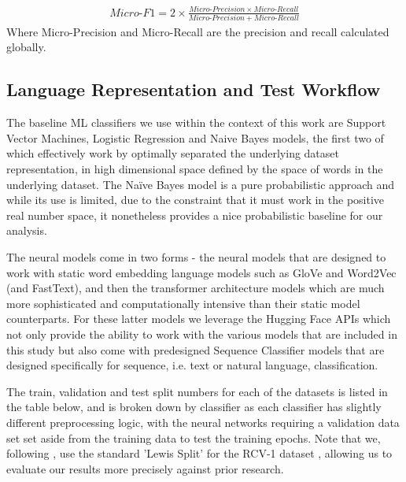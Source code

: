 \documentclass[final]{clv2025-revised}
\begin{document}
\begin{align*}
    Micro\text{-}F1=2\times \frac{Micro \text{-}Precision\times Micro\text{-}Recall}{Micro\text{-}Precision+Micro\text{-}Recall}
\end{align*}
Where Micro-Precision and Micro-Recall are the precision and recall calculated globally.


\subsection{Language Representation and Test Workflow}
The baseline ML classifiers we use within the context of this work are Support Vector Machines, Logistic Regression and Naive Bayes models, the first two of which effectively work by optimally separated the underlying dataset representation, in high dimensional space defined by the space of words in the underlying dataset. The Naïve Bayes model is a pure probabilistic approach and while its use is limited, due to the constraint that it must work in the positive real number space, it nonetheless provides a nice probabilistic baseline for our analysis. 

The neural models come in two forms - the neural models that are designed to work with static word embedding language models such as GloVe and Word2Vec (and FastText), and then the transformer architecture models which are much more sophisticated and computationally intensive than their static model counterparts. For these latter models we leverage the Hugging Face APIs which not only provide the ability to work with the various models that are included in this study but also come with predesigned Sequence Classifier models that are designed specifically for sequence, i.e. text or natural language, classification.

The train, validation and test split numbers for each of the datasets is listed in the table below, and is broken down by classifier as each classifier has slightly different preprocessing logic, with the neural networks requiring a validation data set set aside from the training data to test the training epochs. Note that we, following \cite{moreo2021}, use the standard 'Lewis Split' for the RCV-1 dataset \cite{lewis2004}, allowing us to evaluate our results more precisely against prior research.
\end{document}
